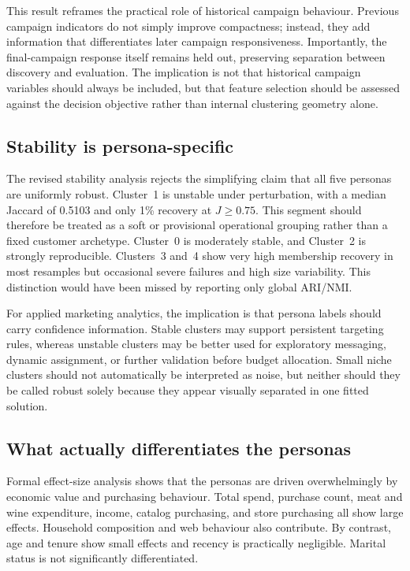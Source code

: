 \documentclass[10pt]{article}
\begin{document}
This result reframes the practical role of historical campaign behaviour. Previous campaign indicators do not simply improve compactness; instead, they add information that differentiates later campaign responsiveness. Importantly, the final-campaign response itself remains held out, preserving separation between discovery and evaluation. The implication is not that historical campaign variables should always be included, but that feature selection should be assessed against the decision objective rather than internal clustering geometry alone.

\subsection{Stability is persona-specific}
The revised stability analysis rejects the simplifying claim that all five personas are uniformly robust. Cluster~1 is unstable under perturbation, with a median Jaccard of 0.5103 and only 1\% recovery at $J\geq0.75$. This segment should therefore be treated as a soft or provisional operational grouping rather than a fixed customer archetype. Cluster~0 is moderately stable, and Cluster~2 is strongly reproducible. Clusters~3 and~4 show very high membership recovery in most resamples but occasional severe failures and high size variability. This distinction would have been missed by reporting only global ARI/NMI.

For applied marketing analytics, the implication is that persona labels should carry confidence information. Stable clusters may support persistent targeting rules, whereas unstable clusters may be better used for exploratory messaging, dynamic assignment, or further validation before budget allocation. Small niche clusters should not automatically be interpreted as noise, but neither should they be called robust solely because they appear visually separated in one fitted solution.

\subsection{What actually differentiates the personas}
Formal effect-size analysis shows that the personas are driven overwhelmingly by economic value and purchasing behaviour. Total spend, purchase count, meat and wine expenditure, income, catalog purchasing, and store purchasing all show large effects. Household composition and web behaviour also contribute. By contrast, age and tenure show small effects and recency is practically negligible. Marital status is not significantly differentiated.
\end{document}
